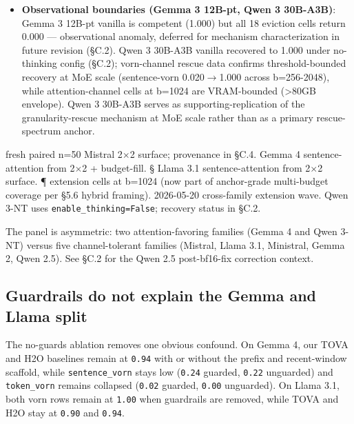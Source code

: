 \documentclass[10pt]{article}
\begin{document}
\begin{itemize}
 spurious vorn-favoring extreme; the differential-channel-bug
 interaction is documented in Appendix C.2.
\item
 \textbf{Observational boundaries (Gemma 3 12B-pt, Qwen 3 30B-A3B)}:
 Gemma 3 12B-pt vanilla is competent (1.000) but all 18 eviction
 cells return 0.000 --- observational anomaly, deferred for mechanism
 characterization in future revision (\S{}C.2). Qwen 3 30B-A3B vanilla
 recovered to 1.000 under no-thinking config (\S{}C.2); vorn-channel
 rescue data confirms threshold-bounded recovery at MoE scale
 (sentence-vorn 0.020$\rightarrow$1.000 across b=256-2048), while
 attention-channel cells at b=1024 are VRAM-bounded (>80GB envelope).
 Qwen 3 30B-A3B serves as supporting-replication of the
 granularity-rescue mechanism at MoE scale rather than as a primary
 rescue-spectrum anchor.
\end{itemize}

\textdagger{} fresh paired n=50 Mistral 2$\times$2 surface; provenance in \S{}C.4. \textdaggerdbl{} Gemma
4 sentence-attention from 2$\times$2 + budget-fill. \S{} Llama 3.1
sentence-attention from 2$\times$2 surface. \P{} extension cells at b=1024 (now
part of anchor-grade multi-budget coverage per \S{}5.6 hybrid framing). \textbar{}\textbar{} 2026-05-20 cross-family extension wave. \textdagger{}\textdagger{} Qwen 3-NT
uses \texttt{enable\_thinking=False}; recovery status in \S{}C.2.

The panel is asymmetric: two attention-favoring families (Gemma 4 and
Qwen 3-NT) versus five channel-tolerant families (Mistral, Llama 3.1,
Ministral, Gemma 2, Qwen 2.5). See \S{}C.2
for the Qwen 2.5 post-bf16-fix correction context.

\subsection{Guardrails do not explain the Gemma and Llama split}\label{53-guardrails-do-not-explain-the-gemma-and-llama-split}

The no-guards ablation removes one obvious confound. On Gemma 4, our
TOVA and H2O baselines remain at \texttt{0.94} with or
without the prefix and recent-window scaffold, while
\texttt{sentence\_vorn} stays low (\texttt{0.24} guarded, \texttt{0.22}
unguarded) and \texttt{token\_vorn} remains collapsed (\texttt{0.02}
guarded, \texttt{0.00} unguarded). On Llama 3.1, both vorn rows remain
at \texttt{1.00} when guardrails are removed, while
TOVA and H2O stay at \texttt{0.90} and \texttt{0.94}.
\end{document}
